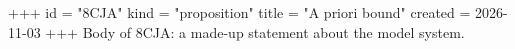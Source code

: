 +++
id = "8CJA"
kind = "proposition"
title = "A priori bound"
created = 2026-11-03
+++
Body of 8CJA: a made-up statement about the model system.
